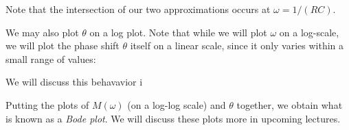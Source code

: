 \documentclass[letterpaper]{article}
\theoremstyle{remark}
\begin{document}
Note that the intersection of our two approximations occurs at $\omega = 1 / (RC)$.

We may also plot $\theta$ on a log plot. Note that while we will plot $\omega$ on a log-scale, we will plot the phase shift $\theta$ itself on a linear scale, since it only varies within a small range of values:
\begin{center}
\end{center}

We will discuss this behavavior i 

Putting the plots of $M(\omega)$ (on a log-log scale) and $\theta$ together, we obtain what is known as a \emph{Bode plot}. We will discuss these plots more in upcoming lectures.
\end{document}
